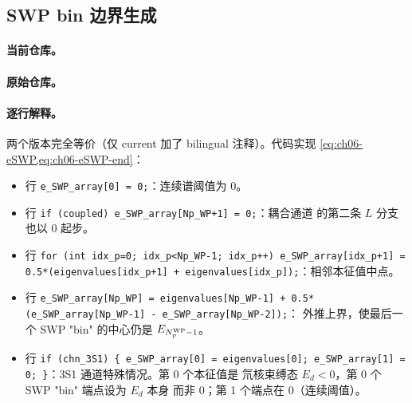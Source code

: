 \subsection{SWP bin 边界生成}
\label{subsec:ch06-code-swp-bin}

\paragraph{当前仓库。}


\paragraph{原始仓库。}


\paragraph{逐行解释。}
两个版本完全等价（仅 current 加了 bilingual 注释）。代码实现
\cref{eq:ch06-eSWP,eq:ch06-eSWP-end}：

\begin{itemize}
  \item 行 \texttt{e\_SWP\_array[0] = 0;}：连续谱阈值为 0。
  \item 行 \texttt{if (coupled) e\_SWP\_array[Np\_WP+1] = 0;}：耦合通道
        的第二条 \(L\) 分支也以 0 起步。
  \item 行 \texttt{for (int idx\_p=0; idx\_p<Np\_WP-1; idx\_p++)
        e\_SWP\_array[idx\_p+1] = 0.5*(eigenvalues[idx\_p+1] +
        eigenvalues[idx\_p]);}：相邻本征值中点。
  \item 行 \texttt{e\_SWP\_array[Np\_WP] = eigenvalues[Np\_WP-1] +
        0.5*(e\_SWP\_array[Np\_WP-1] - e\_SWP\_array[Np\_WP-2]);}：
        外推上界，使最后一个 SWP "bin" 的中心仍是 \(E_{{N_{p}^{\text{WP}}}-1}\)。
  \item 行 \texttt{if (chn\_3S1) \{ e\_SWP\_array[0] = eigenvalues[0];
        e\_SWP\_array[1] = 0; \}}：3S1 通道特殊情况。第 0 个本征值是
        氘核束缚态 \(E_d < 0\)，第 0 个 SWP "bin" 端点设为 \(E_d\) 本身
        而非 0；第 1 个端点在 0（连续阈值）。
\end{itemize}

